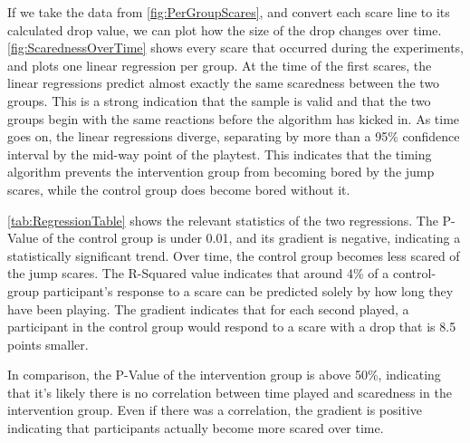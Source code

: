 \documentclass[12pt,a4paper]{article}\usepackage[]{graphicx}\usepackage[]{color}
\begin{document}
If we take the data from \vref{fig:PerGroupScares}, and convert each scare line to its calculated drop value, we can plot how the size of the drop changes over time.
\vref{fig:ScarednessOverTime} shows every scare that occurred during the experiments, and plots one linear regression per group.
At the time of the first scares, the linear regressions predict almost exactly the same scaredness between the two groups.
This is a strong indication that the sample is valid and that the two groups begin with the same reactions before the algorithm has kicked in.
As time goes on, the linear regressions diverge, separating by more than a 95\% confidence interval by the mid-way point of the playtest.
This indicates that the timing algorithm prevents the intervention group from becoming bored by the jump scares, while the control group does become bored without it.

\vref{tab:RegressionTable} shows the relevant statistics of the two regressions.
The P-Value of the control group is under 0.01, and its gradient is negative, indicating a statistically significant trend.
Over time, the control group becomes less scared of the jump scares.
The R-Squared value indicates that around 4\% of a control-group participant's response to a scare can be predicted solely by how long they have been playing.
The gradient indicates that for each second played, a participant in the control group would respond to a scare with a drop that is 8.5 points smaller.

In comparison, the P-Value of the intervention group is above 50\%, indicating that it's likely there is no correlation between time played and scaredness in the intervention group.
Even if there was a correlation, the gradient is positive indicating that participants actually become more scared over time.
\end{document}

